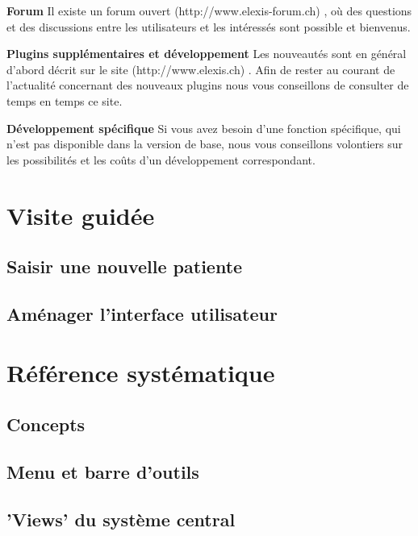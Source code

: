 \documentclass[paper=a4,BCOR8.25mm,twoside]{scrbook}
\begin{document}
\bigskip

\textbf{Forum}
Il existe un forum ouvert (http://www.elexis-forum.ch) , où des questions
et des discussions entre les utilisateurs et les intéressés sont possible et bienvenus.

\bigskip

\textbf{Plugins supplémentaires et développement }
Les nouveautés sont en général d'abord décrit sur le site (http://www.elexis.ch) . Afin de rester au courant de l'actualité concernant des nouveaux plugins nous vous conseillons de consulter de temps en temps ce site.


\bigskip
{}
\textbf{Développement spécifique }
Si vous avez besoin d'une fonction spécifique, qui n'est pas disponible dans la version de base, nous vous conseillons volontiers sur les possibilités et les coûts d'un développement correspondant.




\part{Visite guidée}
\chapter{Saisir une nouvelle patiente}
\label{tour}
	
\chapter{Aménager l'interface utilisateur}
	\label{customize}
	

\part{Référence systématique}
\chapter{Concepts}
	
\chapter{Menu et barre d'outils} 					
	
\chapter{'Views' du système central}
	
	
	
	
	
	
	
\end{document}
